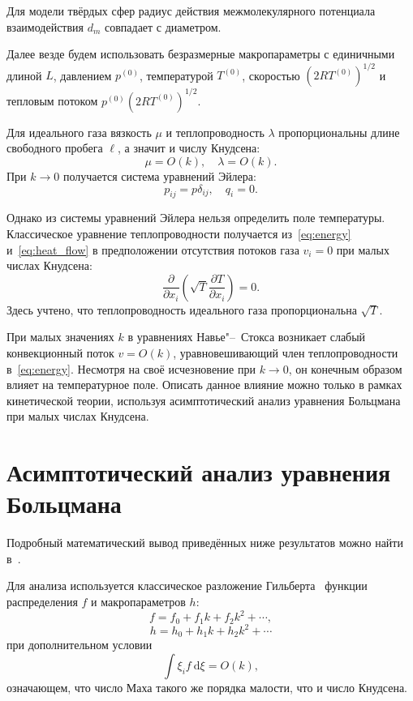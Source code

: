 \documentclass[english,russian,a4paper,10pt]{article}
\newcommand{\dd}{\:\mathrm{d}}
\newcommand{\pder}[2][]{\frac{\partial#1}{\partial#2}}
\begin{document}
Для модели твёрдых сфер радиус действия межмолекулярного потенциала взаимодействия \(d_m\)
совпадает с диаметром.

Далее везде будем использовать безразмерные макропараметры с единичными
длиной \(L\), давлением \(p^{(0)}\), температурой \(T^{(0)}\),
скоростью \((2RT^{(0)})^{1/2}\) и тепловым потоком \(p^{(0)}(2RT^{(0)})^{1/2}\).

Для идеального газа вязкость \(\mu\) и теплопроводность \(\lambda\)
пропорциональны длине свободного пробега \(\ell\), а значит и числу Кнудсена:
\begin{equation}
	\mu = O(k), \quad \lambda = O(k).
\end{equation}
При \(k\to0\) получается система уравнений Эйлера:
\begin{equation}
	p_{ij} = p\delta_{ij}, \quad q_i = 0.
\end{equation}

Однако из системы уравнений Эйлера нельзя определить поле температуры.
Классическое уравнение теплопроводности получается из~\eqref{eq:energy} и~\eqref{eq:heat_flow}
в предположении отсутствия потоков газа \(v_i = 0\) при малых числах Кнудсена:
\begin{equation}\label{eq:heat_equation}
	\pder{x_i}\left(\sqrt{T}\pder[T]{x_i}\right) = 0.
\end{equation}
Здесь учтено, что теплопроводность идеального газа пропорциональна \(\sqrt{T}\).

При малых значениях \(k\) в уравнениях Навье"--~Стокса возникает слабый конвекционный поток \(v=O(k)\),
уравновешивающий член теплопроводности в~\eqref{eq:energy}.
Несмотря на своё исчезновение при \(k\to0\), он конечным образом влияет на температурное поле.
Описать данное влияние можно только в рамках кинетической теории, используя асимптотический анализ 
уравнения Больцмана при малых числах Кнудсена.

\section{Асимптотический анализ уравнения Больцмана}
Подробный математический вывод приведённых ниже результатов можно найти в~\cite{Sone2002}.

Для анализа используется классическое разложение Гильберта~\cite{Hilbert1912}
функции распределения \(f\) и макропараметров \(h\):
\[ f = f_0 + f_1k + f_2k^2 + \cdots, \]
\[ h = h_0 + h_1k + h_2k^2 + \cdots \]
при дополнительном условии
\begin{equation}\label{eq:Mach_constraint}
	\int\xi_if\dd\xi = O(k),
\end{equation}
означающем, что число Маха такого же порядка малости, что и число Кнудсена.
\end{document}
